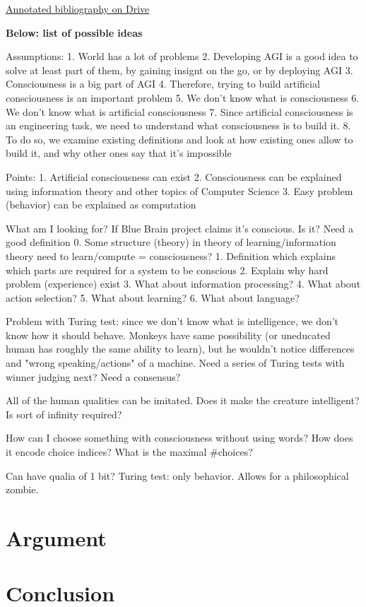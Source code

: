 \documentclass[a4paper, 12pt]{article}
\begin{document}
\href{https://docs.google.com/document/d/1kh4wC9YHNJEcCBxE1eaymw9PPa1VdCW25BH0GEIQgj4/edit#heading=h.ptmcnj925n6h}{Annotated bibliography on Drive}

{\bf Below: list of possible ideas}

Assumptions:
1. World has a lot of problems
2. Developing AGI is a good idea to solve at least part of them, by gaining insignt on the go, or by deploying AGI
3. Consciousness is a big part of AGI
4. Therefore, trying to build artificial consciousness is an important problem
5. We don't know what is consciousness
6. We don't know what is artificial consciousness
7. Since artificial consciousness is an engineering task, we need to understand what consciousness is to build it.
8. To do so, we examine existing definitions and look at how existing ones allow to build it, and why other ones say that it's impossible

Points:
1. Artificial consciousness can exist
2. Consciousness can be explained using information theory and other topics of Computer Science
3. Easy problem (behavior) can be explained as computation

What am I looking for?
If Blue Brain project claims it’s conscious. Is it? Need a good definition
0. Some structure (theory) in theory of learning/information theory need to learn/compute = consciousness?
1. Definition which explains which parts are required for a system to be conscious
2. Explain why hard problem (experience) exist
3. What about information processing?
4. What about action selection?
5. What about learning?
6. What about language?


Problem with Turing test: since we don't know what is intelligence, we don't know how it should behave. Monkeys have same possibility (or uneducated human has roughly the same ability to learn), but he wouldn't notice differences and "wrong speaking/actions" of a machine. Need a series of Turing tests with winner judging next? Need a consensus? 

All of the human qualities can be imitated. Does it make the creature intelligent? Is sort of infinity required?

How can I choose something with consciousness without using words? How does it encode choice indices? What is the maximal \#choices?

Can have qualia of 1 bit?
Turing test: only behavior. Allows for a philosophical zombie.

\section{Argument}
\section{Conclusion}

\begin{thebibliography}{20}
\end{thebibliography}
\end{document}
